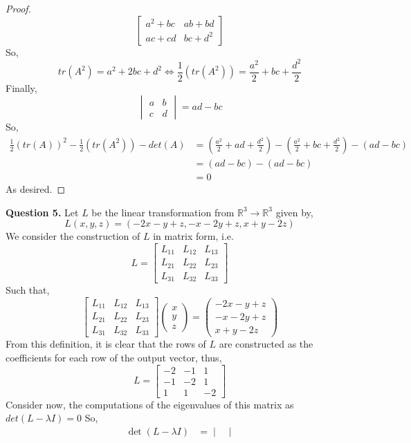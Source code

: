 \documentclass[letterpaper,10pt]{article}
\newcommand{\R}{\mathbb{R}}
\begin{document}
\begin{description}
\begin{proof}
\[\begin{bmatrix}
a^2+bc & ab+bd\\
ac+cd & bc+d^2
\end{bmatrix} \]
So,
\[tr(A^2)=a^2+2bc+d^2\Leftrightarrow \frac{1}{2}(tr(A^2))=\frac{a^2}{2}+bc+\frac{d^2}{2} \]
Finally,
\[\begin{vmatrix}
a & b\\
c & d
\end{vmatrix}=ad-bc \]
So,
\begin{align*}
\frac{1}{2}(tr(A))^2-\frac{1}{2}(tr(A^2))-det(A) &= (\frac{a^2}{2}+ad+\frac{d^2}{2})-(\frac{a^2}{2}+bc+\frac{d^2}{2})-(ad-bc)\\
&=(ad-bc)-(ad-bc)\\
&=0
\end{align*}
As desired.
\end{proof}
\item \textbf{Question 5.}
Let $L$ be the linear transformation from $\R^3\to \R^3$ given by,
\[L(x,y,z)=(-2x-y+z,-x-2y+z,x+y-2z)\]
We consider the construction of $L$ in matrix form, i.e.
\[L=\begin{bmatrix}
L_{11} & L_{12} & L_{13} \\
L_{21} & L_{22} & L_{23} \\
L_{31} & L_{32} & L_{33}
\end{bmatrix} \]
Such that,
\[\begin{bmatrix}
L_{11} & L_{12} & L_{13} \\
L_{21} & L_{22} & L_{23} \\
L_{31} & L_{32} & L_{33}
\end{bmatrix}\begin{pmatrix}
x\\
y\\
z
\end{pmatrix}=\begin{pmatrix}
-2x-y+z \\
-x-2y+z \\
x+y-2z
\end{pmatrix} \]
From this definition, it is clear that the rows of $L$ are constructed as the coefficients for each row of the output vector, thus,
\[L=\begin{bmatrix}
-2 & -1 & 1\\
-1 & -2 & 1\\
1 & 1 & -2
\end{bmatrix} \]
Consider now, the computations of the eigenvalues of this matrix as $det(L-\lambda I)=0$ So,
\begin{align*}
\det(L-\lambda I) &= \begin{vmatrix}

\end{vmatrix}
\end{align*}
\end{description}
\end{document}
